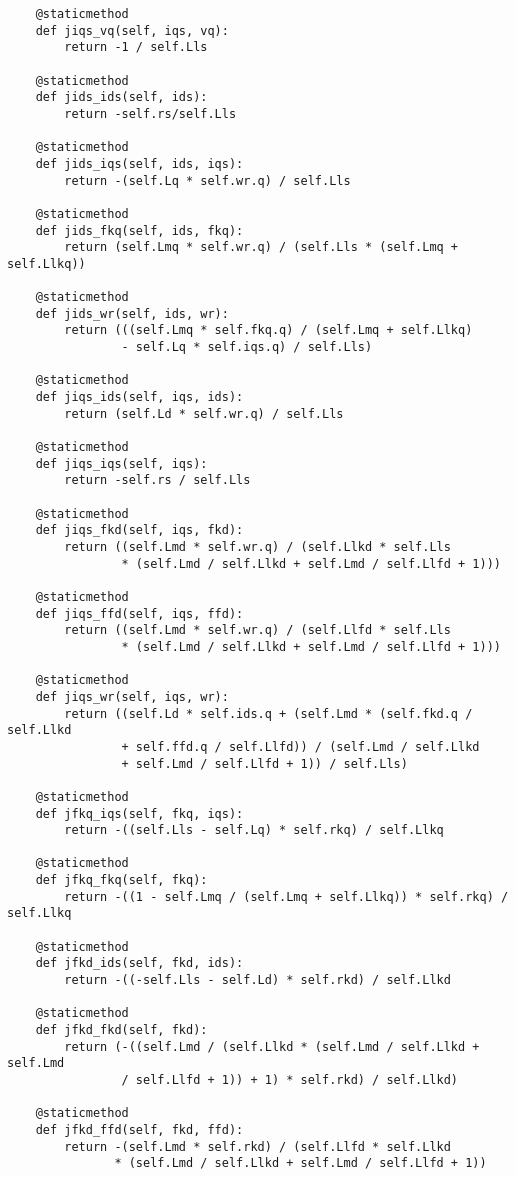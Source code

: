 \begin{lstlisting}
    @staticmethod
    def jiqs_vq(self, iqs, vq):
        return -1 / self.Lls

    @staticmethod
    def jids_ids(self, ids):
        return -self.rs/self.Lls

    @staticmethod
    def jids_iqs(self, ids, iqs):
        return -(self.Lq * self.wr.q) / self.Lls

    @staticmethod
    def jids_fkq(self, ids, fkq):
        return (self.Lmq * self.wr.q) / (self.Lls * (self.Lmq + self.Llkq))

    @staticmethod
    def jids_wr(self, ids, wr):
        return (((self.Lmq * self.fkq.q) / (self.Lmq + self.Llkq)
                - self.Lq * self.iqs.q) / self.Lls)

    @staticmethod
    def jiqs_ids(self, iqs, ids):
        return (self.Ld * self.wr.q) / self.Lls

    @staticmethod
    def jiqs_iqs(self, iqs):
        return -self.rs / self.Lls

    @staticmethod
    def jiqs_fkd(self, iqs, fkd):
        return ((self.Lmd * self.wr.q) / (self.Llkd * self.Lls
                * (self.Lmd / self.Llkd + self.Lmd / self.Llfd + 1)))

    @staticmethod
    def jiqs_ffd(self, iqs, ffd):
        return ((self.Lmd * self.wr.q) / (self.Llfd * self.Lls
                * (self.Lmd / self.Llkd + self.Lmd / self.Llfd + 1)))

    @staticmethod
    def jiqs_wr(self, iqs, wr):
        return ((self.Ld * self.ids.q + (self.Lmd * (self.fkd.q / self.Llkd
                + self.ffd.q / self.Llfd)) / (self.Lmd / self.Llkd
                + self.Lmd / self.Llfd + 1)) / self.Lls)

    @staticmethod
    def jfkq_iqs(self, fkq, iqs):
        return -((self.Lls - self.Lq) * self.rkq) / self.Llkq

    @staticmethod
    def jfkq_fkq(self, fkq):
        return -((1 - self.Lmq / (self.Lmq + self.Llkq)) * self.rkq) / self.Llkq

    @staticmethod
    def jfkd_ids(self, fkd, ids):
        return -((-self.Lls - self.Ld) * self.rkd) / self.Llkd

    @staticmethod
    def jfkd_fkd(self, fkd):
        return (-((self.Lmd / (self.Llkd * (self.Lmd / self.Llkd + self.Lmd
                / self.Llfd + 1)) + 1) * self.rkd) / self.Llkd)

    @staticmethod
    def jfkd_ffd(self, fkd, ffd):
        return -(self.Lmd * self.rkd) / (self.Llfd * self.Llkd
               * (self.Lmd / self.Llkd + self.Lmd / self.Llfd + 1))


\end{lstlisting}
